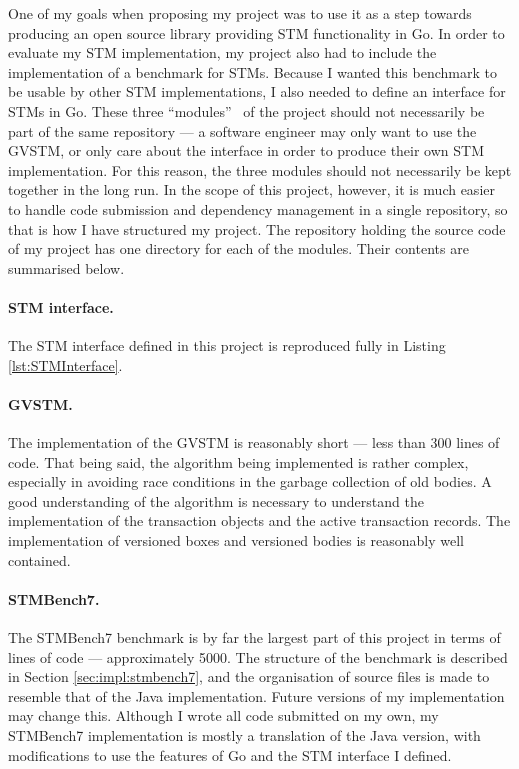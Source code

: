 \documentclass[12pt,a4paper,oneside,openright]{report}
\begin{document}
One of my goals when proposing my project was to use it as a step
towards producing an open source library providing STM functionality
in Go. In order to evaluate my STM implementation, my project also had
to include the implementation of a benchmark for STMs. Because I
wanted this benchmark to be usable by other STM implementations, I
also needed to define an interface for STMs in Go. These three
``modules''~\cite[Section~1.1]{SoftwareArchitecture} of the project
should not necessarily be part of the same repository --- a software
engineer may only want to use the GVSTM, or only care about the
interface in order to produce their own STM implementation. For this
reason, the three modules should not necessarily be kept together in
the long run. In the scope of this project, however, it is much easier
to handle code submission and dependency management in a single
repository, so that is how I have structured my project. The
repository holding the source code of my project has one directory for
each of the modules. Their contents are summarised below.

\paragraph{STM interface.} The STM interface defined in this project
is reproduced fully in Listing \ref{lst:STMInterface}.

\paragraph{GVSTM.} The implementation of the GVSTM is reasonably short
--- less than 300 lines of code. That being said, the algorithm being
implemented is rather complex, especially in avoiding race conditions
in the garbage collection of old bodies. A good understanding of the
algorithm is necessary to understand the implementation of the
transaction objects and the active transaction records. The
implementation of versioned boxes and versioned bodies is reasonably
well contained.

\paragraph{STMBench7.} The STMBench7 benchmark is by far the largest
part of this project in terms of lines of code --- approximately
5000. The structure of the benchmark is described in Section
\ref{sec:impl:stmbench7}, and the organisation of source files is made
to resemble that of the Java implementation. Future versions of my
implementation may change this. Although I wrote all code submitted on
my own, my STMBench7 implementation is mostly a translation of the
Java version, with modifications to use the features of Go and the STM
interface I defined.
\end{document}
